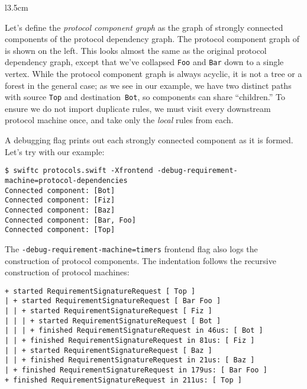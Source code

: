 \documentclass[../generics]{subfiles}
\begin{document}
\begin{wrapfigure}{l}{3.5cm}
\end{wrapfigure}

Let's define the \emph{protocol component graph} as the graph of strongly connected components of the protocol dependency graph. The protocol component graph of  is shown on the left. This looks almost the same as the original protocol dependency graph, except that we've collapsed \texttt{Foo} and \texttt{Bar} down to a single vertex. While the protocol component graph is always acyclic, it is not a tree or a forest in the general case; as we see in our example, we have two distinct paths with source \texttt{Top} and destination~\texttt{Bot}, so components can share ``children.'' To ensure we do not import duplicate rules, we must visit every downstream protocol machine once, and take only the \emph{local} rules from each.

A debugging flag prints out each strongly connected component as it is formed. Let's try with our example:
\begin{Verbatim}[fontsize=\footnotesize,numbers=none]
$ swiftc protocols.swift -Xfrontend -debug-requirement-machine=protocol-dependencies
Connected component: [Bot]
Connected component: [Fiz]
Connected component: [Baz]
Connected component: [Bar, Foo]
Connected component: [Top]
\end{Verbatim}

The
\texttt{-debug-requirement-machine=timers} frontend flag also logs the construction of protocol components. The indentation follows the recursive construction of protocol machines:
\begin{Verbatim}[fontsize=\footnotesize,numbers=none]
+ started RequirementSignatureRequest [ Top ]
| + started RequirementSignatureRequest [ Bar Foo ]
| | + started RequirementSignatureRequest [ Fiz ]
| | | + started RequirementSignatureRequest [ Bot ]
| | | + finished RequirementSignatureRequest in 46us: [ Bot ]
| | + finished RequirementSignatureRequest in 81us: [ Fiz ]
| | + started RequirementSignatureRequest [ Baz ]
| | + finished RequirementSignatureRequest in 21us: [ Baz ]
| + finished RequirementSignatureRequest in 179us: [ Bar Foo ]
+ finished RequirementSignatureRequest in 211us: [ Top ]
\end{Verbatim}
\end{document}
